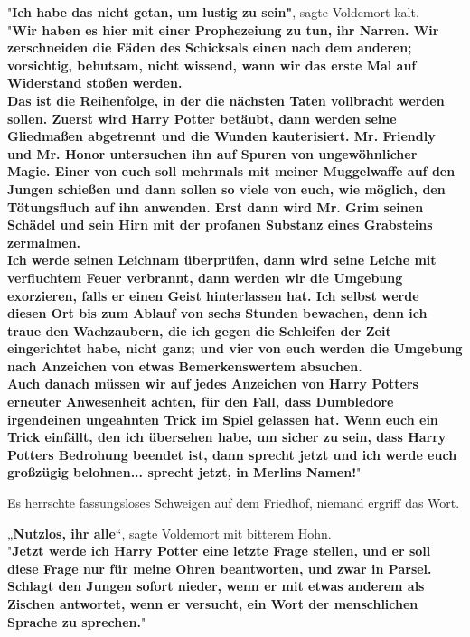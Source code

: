{"\textbf{Ich habe das nicht getan, um lustig zu sein"}, sagte Voldemort kalt.\\ "\textbf{Wir haben es hier mit einer Prophezeiung zu tun, ihr Narren. Wir zerschneiden die Fäden des Schicksals einen nach dem anderen; vorsichtig, behutsam, nicht wissend, wann wir das erste Mal auf Widerstand stoßen werden.}\\ \textbf{\hfill\break Das ist die Reihenfolge, in der die nächsten Taten vollbracht werden sollen. Zuerst wird Harry Potter betäubt, dann werden seine Gliedmaßen abgetrennt und die Wunden kauterisiert. Mr. Friendly und Mr. Honor untersuchen ihn auf Spuren von ungewöhnlicher Magie. Einer von euch soll mehrmals mit meiner Muggelwaffe auf den Jungen schießen und dann sollen so viele von euch, wie möglich, den Tötungsfluch auf ihn anwenden. Erst dann wird Mr. Grim seinen Schädel und sein Hirn mit der profanen Substanz eines Grabsteins zermalmen.}\\ \textbf{\hfill\break Ich werde seinen Leichnam überprüfen, dann wird seine Leiche mit verfluchtem Feuer verbrannt, dann werden wir die Umgebung exorzieren, falls er einen Geist hinterlassen hat. Ich selbst werde diesen Ort bis zum Ablauf von sechs Stunden bewachen, denn ich traue den Wachzaubern, die ich gegen die Schleifen der Zeit eingerichtet habe, nicht ganz; und vier von euch werden die Umgebung nach Anzeichen von etwas Bemerkenswertem absuchen.}\\ \textbf{\hfill\break Auch danach müssen wir auf jedes Anzeichen von Harry Potters erneuter Anwesenheit achten, für den Fall, dass Dumbledore irgendeinen ungeahnten Trick im Spiel gelassen hat. Wenn euch ein Trick einfällt, den ich übersehen habe, um sicher zu sein, dass Harry Potters Bedrohung beendet ist, dann sprecht jetzt und ich werde euch großzügig belohnen... sprecht jetzt, in Merlins Namen!}"

Es herrschte fassungsloses Schweigen auf dem Friedhof, niemand ergriff das Wort.

„\textbf{Nutzlos, ihr alle}“, sagte Voldemort mit bitterem Hohn.\\ "\textbf{Jetzt werde ich Harry Potter eine letzte Frage stellen, und er soll diese Frage nur für meine Ohren beantworten, und zwar in Parsel. Schlagt den Jungen sofort nieder, wenn er mit etwas anderem als Zischen antwortet, wenn er versucht, ein Wort der menschlichen Sprache zu sprechen.}"

}
